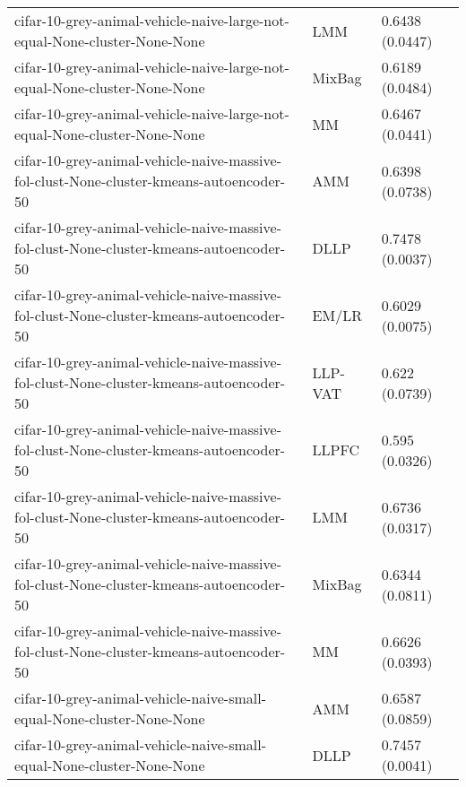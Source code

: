 \begin{longtable}{lll}
                                    cifar-10-grey-animal-vehicle-naive-large-not-equal-None-cluster-None-None &       LMM &                       0.6438 (0.0447) \\
                                    cifar-10-grey-animal-vehicle-naive-large-not-equal-None-cluster-None-None &    MixBag &                       0.6189 (0.0484) \\
                                    cifar-10-grey-animal-vehicle-naive-large-not-equal-None-cluster-None-None &        MM &                       0.6467 (0.0441) \\
                      cifar-10-grey-animal-vehicle-naive-massive-fol-clust-None-cluster-kmeans-autoencoder-50 &       AMM &                       0.6398 (0.0738) \\
                      cifar-10-grey-animal-vehicle-naive-massive-fol-clust-None-cluster-kmeans-autoencoder-50 &      DLLP &                       0.7478 (0.0037) \\
                      cifar-10-grey-animal-vehicle-naive-massive-fol-clust-None-cluster-kmeans-autoencoder-50 &     EM/LR &                       0.6029 (0.0075) \\
                      cifar-10-grey-animal-vehicle-naive-massive-fol-clust-None-cluster-kmeans-autoencoder-50 &   LLP-VAT &                        0.622 (0.0739) \\
                      cifar-10-grey-animal-vehicle-naive-massive-fol-clust-None-cluster-kmeans-autoencoder-50 &     LLPFC &                        0.595 (0.0326) \\
                      cifar-10-grey-animal-vehicle-naive-massive-fol-clust-None-cluster-kmeans-autoencoder-50 &       LMM &                       0.6736 (0.0317) \\
                      cifar-10-grey-animal-vehicle-naive-massive-fol-clust-None-cluster-kmeans-autoencoder-50 &    MixBag &                       0.6344 (0.0811) \\
                      cifar-10-grey-animal-vehicle-naive-massive-fol-clust-None-cluster-kmeans-autoencoder-50 &        MM &                       0.6626 (0.0393) \\
                                        cifar-10-grey-animal-vehicle-naive-small-equal-None-cluster-None-None &       AMM &                       0.6587 (0.0859) \\
                                        cifar-10-grey-animal-vehicle-naive-small-equal-None-cluster-None-None &      DLLP &                       0.7457 (0.0041) \\

\end{longtable}
